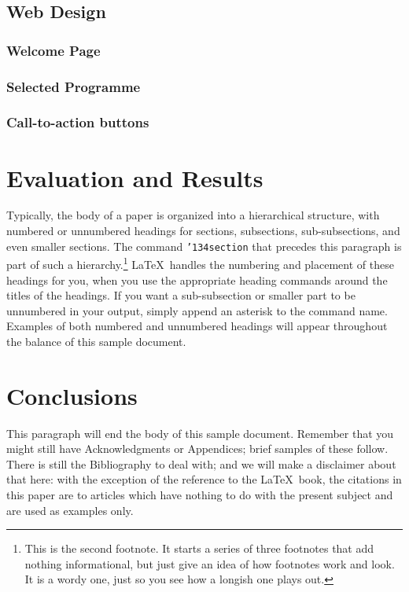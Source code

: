 \documentclass{acm_proc_article-sp}
\begin{document}
\subsection{Web Design}

\subsubsection{Welcome Page}

\subsubsection{Selected Programme}

\subsubsection{Call-to-action buttons}

\section{Evaluation and Results}
Typically, the body of a paper is organized
into a hierarchical structure, with numbered or unnumbered
headings for sections, subsections, sub-subsections, and even
smaller sections.  The command \texttt{{\char'134}section} that
precedes this paragraph is part of such a
hierarchy.\footnote{This is the second footnote.  It
starts a series of three footnotes that add nothing
informational, but just give an idea of how footnotes work
and look. It is a wordy one, just so you see
how a longish one plays out.} \LaTeX\ handles the numbering
and placement of these headings for you, when you use
the appropriate heading commands around the titles
of the headings.  If you want a sub-subsection or
smaller part to be unnumbered in your output, simply append an
asterisk to the command name.  Examples of both
numbered and unnumbered headings will appear throughout the
balance of this sample document.

\section{Conclusions}
This paragraph will end the body of this sample document.
Remember that you might still have Acknowledgments or
Appendices; brief samples of these
follow.  There is still the Bibliography to deal with; and
we will make a disclaimer about that here: with the exception
of the reference to the \LaTeX\ book, the citations in
this paper are to articles which have nothing to
do with the present subject and are used as
examples only.
\end{document}
